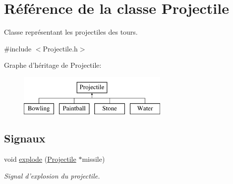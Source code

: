 \hypertarget{classProjectile}{
\section{Référence de la classe Projectile}
\label{classProjectile}
}


Classe représentant les projectiles des tours.  




{\ttfamily \#include $<$Projectile.h$>$}

Graphe d'héritage de Projectile:\begin{figure}[H]
\begin{center}
\leavevmode
\includegraphics[height=2.000000cm]{classProjectile}
\end{center}
\end{figure}
\subsection*{Signaux}
\begin{DoxyCompactItemize}
\item 
void \hyperlink{classProjectile_a18d1fccd74f92b54f239c13c74cbc00c}{explode} (\hyperlink{classProjectile}{Projectile} $\ast$missile)
\begin{DoxyCompactList}\small\item\em Signal d'explosion du projectile. \end{DoxyCompactList}\end{DoxyCompactItemize}
